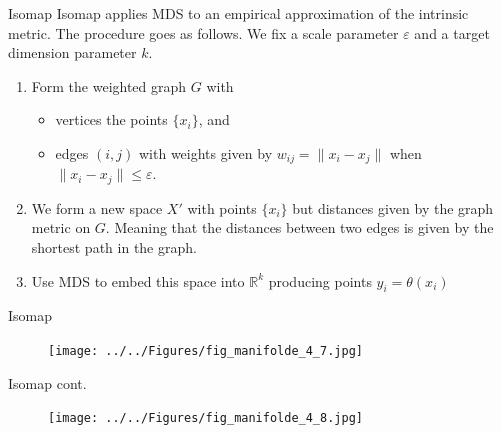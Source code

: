 \documentclass{beamer}
\begin{document}
\begin{frame}{Isomap}
	Isomap applies MDS to an empirical approximation of the intrinsic metric.
	The procedure goes as follows. We fix a scale parameter $\varepsilon$ and a target dimension parameter $k$.
	
	\begin{enumerate}
		\item Form the weighted graph $G$ with
		\begin{itemize}
			\item vertices the points $\{x_i\}$, and
			\item edges $(i,j)$ with weights given by $w_{ij}=\| x_i -x_j\|$ when $\|x_i -x_j\| \le \varepsilon$.
		\end{itemize}
		\item We form a new space $X'$ with points $\{x_i\}$ but distances given by the graph metric on $G$.  Meaning that the distances between two edges is given by the shortest path in the graph.
		\item Use MDS to embed this space into $\mathbb{R}^k$ producing points $y_i = \theta(x_i)$
	\end{enumerate}
\end{frame}

\begin{frame}{Isomap}
	\begin{figure}[h]
		\centering
		\texttt{[image: ../../Figures/fig\_manifolde\_4\_7.jpg]}
	\end{figure}	
\end{frame}

\begin{frame}{Isomap cont.}
		\begin{figure}[h]
		\centering
		\texttt{[image: ../../Figures/fig\_manifolde\_4\_8.jpg]}
	\end{figure}	
\end{frame}
\end{document}
